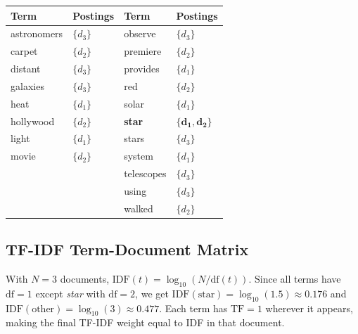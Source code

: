 \documentclass{svproc}
\begin{document}
    \begin{center}
    \renewcommand{\arraystretch}{1.15}
    \begin{tabular}{ll|ll}
    \toprule
    \textbf{Term} & \textbf{Postings} & \textbf{Term} & \textbf{Postings} \\
    \midrule
    astronomers & $\{d_3\}$ & observe   & $\{d_3\}$ \\
    carpet      & $\{d_2\}$ & premiere  & $\{d_2\}$ \\
    distant     & $\{d_3\}$ & provides  & $\{d_1\}$ \\
    galaxies    & $\{d_3\}$ & red       & $\{d_2\}$ \\
    heat        & $\{d_1\}$ & solar     & $\{d_1\}$ \\
    hollywood   & $\{d_2\}$ & \textbf{star} & $\mathbf{\{d_1, d_2\}}$ \\
    light       & $\{d_1\}$ & stars     & $\{d_3\}$ \\
    movie       & $\{d_2\}$ & system    & $\{d_1\}$ \\
    &                       & telescopes& $\{d_3\}$ \\
    &                       & using     & $\{d_3\}$ \\
    &                       & walked    & $\{d_2\}$ \\
    \bottomrule
    \end{tabular}
    \end{center}

    \subsection{TF-IDF Term-Document Matrix}

    With $N=3$ documents, $\mathrm{IDF}(t) = \log_{10}(N / \mathrm{df}(t))$. Since all terms have $\mathrm{df}=1$ except \textit{star} with $\mathrm{df}=2$, we get $\mathrm{IDF}(\text{star}) = \log_{10}(1.5) \approx 0.176$ and $\mathrm{IDF}(\text{other}) = \log_{10}(3) \approx 0.477$. Each term has $\mathrm{TF}=1$ wherever it appears, making the final TF-IDF weight equal to IDF in that document.
\end{document}
